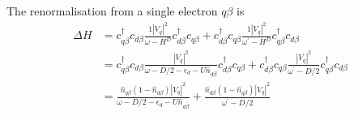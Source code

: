 The renormalisation from a single electron \(q\beta\) is
\begin{equation}\begin{aligned}
	\Delta H &= c^\dagger_{q\beta}c_{d\beta} \frac{1|V_q|^2}{\omega - H^D}c_{d\beta}^\dagger c_{q\beta} + c_{d\beta}^\dagger c_{q\beta}\frac{1|V_q|^2}{\omega^\prime - H^D}c^\dagger_{q\beta}c_{d\beta} \\
		 &= c^\dagger_{q\beta}c_{d\beta} \frac{|V_q|^2}{\omega - D/2 - \epsilon_d - U \hat n_{d\bar\beta}}c_{d\beta}^\dagger c_{q\beta} + c_{d\beta}^\dagger c_{q\beta}\frac{|V_q|^2}{\omega^\prime - D/2}c^\dagger_{q\beta}c_{d\beta}\\
		 &=  \frac{\hat n_{q\beta}\left( 1 - \hat n_{d\beta} \right) |V_q|^2}{\omega - D/2 - \epsilon_d - U \hat n_{d\bar\beta}} + \frac{\hat n_{d\beta}\left( 1 - \hat n_{q\beta} \right) |V_q|^2}{\omega^\prime - D/2}
\end{aligned}\end{equation}

